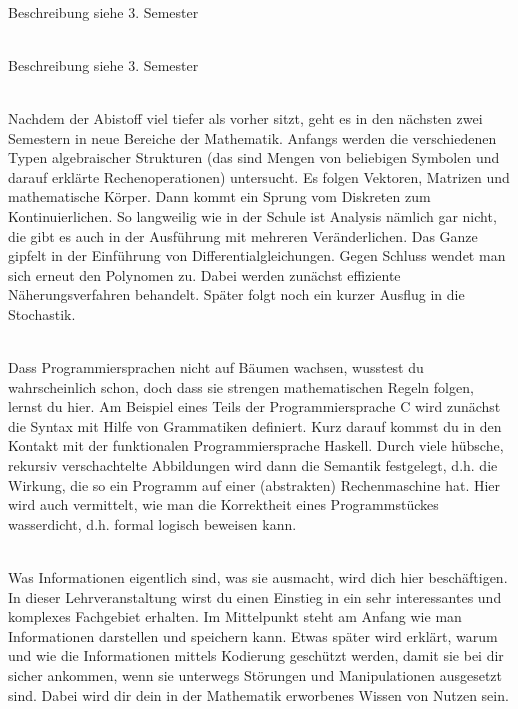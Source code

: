 \textbf{} \\
Beschreibung siehe 3. Semester

\textbf{} \\
Beschreibung siehe 3. Semester



\textbf{} \\
Nachdem der Abistoff viel tiefer als vorher sitzt, geht es in den nächsten zwei Semestern in neue Bereiche der Mathematik.
Anfangs werden die verschiedenen Typen algebraischer Strukturen (das sind Mengen von beliebigen Symbolen und darauf erklärte Rechenoperationen) untersucht.
Es folgen Vektoren, Matrizen und mathematische Körper.
Dann kommt ein Sprung vom Diskreten zum Kontinuierlichen.
So langweilig wie in der Schule ist Analysis nämlich gar nicht, die gibt es auch in der Ausführung mit mehreren Veränderlichen.
Das Ganze gipfelt in der Einführung von Differentialgleichungen.
Gegen Schluss wendet man sich erneut den Polynomen zu.
Dabei werden zunächst effiziente Näherungsverfahren behandelt.
Später folgt noch ein kurzer Ausflug in die Stochastik.

\textbf{} \\
Dass Programmiersprachen nicht auf Bäumen wachsen, wusstest du wahrscheinlich schon, doch dass sie strengen mathematischen Regeln folgen, lernst du hier.
Am Beispiel eines Teils der Programmiersprache C wird zunächst die Syntax mit Hilfe von Grammatiken definiert.
Kurz darauf kommst du in den Kontakt mit der funktionalen Programmiersprache Haskell.
Durch viele hübsche, rekursiv verschachtelte Abbildungen wird dann die Semantik festgelegt, d.h. die Wirkung, die so ein Programm auf einer (abstrakten) Rechenmaschine hat.
Hier wird auch vermittelt, wie man die Korrektheit eines Programmstückes \glqq wasserdicht\grqq, d.h. formal logisch beweisen kann.

\textbf{} \\
Was Informationen eigentlich sind, was sie ausmacht, wird dich hier beschäftigen.
In dieser Lehrveranstaltung wirst du einen Einstieg in ein sehr interessantes und komplexes Fachgebiet erhalten.
Im Mittelpunkt steht am Anfang wie man Informationen darstellen und speichern kann.
Etwas später wird erklärt, warum und wie die Informationen mittels Kodierung geschützt werden, damit sie bei dir sicher ankommen, wenn sie unterwegs Störungen und Manipulationen ausgesetzt sind.
Dabei wird dir dein in der Mathematik erworbenes Wissen von Nutzen sein.

